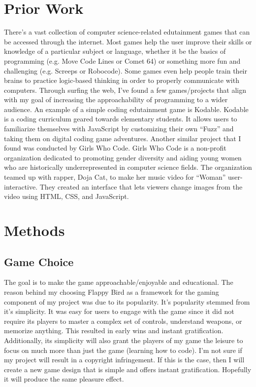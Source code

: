 \documentclass[10pt,twocolumn]{article}
\begin{document}
\section{Prior Work}
There’s a vast collection of computer science-related edutainment games that can be accessed through the internet. Most games help the user improve their skills or knowledge of a particular subject or language, whether it be the basics of programming (e.g. Move Code Lines or Comet 64) or something more fun and challenging (e.g. Screeps or Robocode). Some games even help people train their brains to practice logic-based thinking in order to properly communicate with computers. 
Through surfing the web, I’ve found a few games/projects that align with my goal of increasing the approachability of programming to a wider audience. An example of a simple coding edutainment game is Kodable. Kodable is a coding curriculum geared towards elementary students. It allows users to familiarize themselves with JavaScript by customizing their own “Fuzz” and taking them on digital coding game adventures. 
Another similar project that I found was conducted by Girls Who Code. Girls Who Code is a non-profit organization dedicated to promoting gender diversity and aiding young women who are historically underrepresented in computer science fields. The organization teamed up with rapper, Doja Cat, to make her music video for “Woman” user-interactive. They created an interface that lets viewers change images from the video using HTML, CSS, and JavaScript. 

\section{Methods}
\subsection{Game Choice}
The goal is to make the game approachable/enjoyable and educational. The reason behind my choosing Flappy Bird as a framework for the gaming component of my project was due to its popularity. It's popularity stemmed from it's simplicity. It was easy for users to engage with the game since it did not require its players to master a complex set of controls, understand weapons, or memorize anything. This resulted in early wins and instant gratification. Additionally, its simplicity will also grant the players of my game the leisure to focus on much more than just the game (learning how to code).
I'm not sure if my project will result in a copyright infringement. If this is the case, then I will create a new game design that is simple and offers instant gratification. Hopefully it will produce the same pleasure effect.
\end{document}
